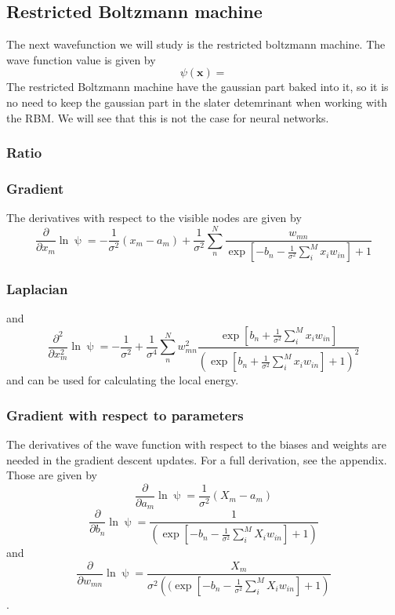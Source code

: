 \subsection{Restricted Boltzmann machine}
The next wavefunction we will study is the restricted boltzmann machine. The wave function value is given by
\begin{equation}
    \psi(\boldsymbol{x}) = 
\end{equation}
The restricted Boltzmann machine have the gaussian part baked into it, so it is no need to keep the gaussian part in the slater detemrinant when working with the RBM. We will see that this is not the case for neural networks. 
\subsubsection{Ratio}

\subsubsection{Gradient}
The derivatives with respect to the visible nodes are given by
\begin{equation}
    \frac{\partial}{\partial x_m}\ln \uppsi = -\frac{1}{\sigma^2}(x_m - a_m) + \frac{1}{\sigma^2} \sum_n^N \frac{w_{mn}}{\exp\left[-b_n - \frac{1}{\sigma^2}\sum_i^Mx_iw_{in}\right] + 1}
\end{equation}
 
\subsubsection{Laplacian}
and 
\begin{equation}
    \frac{\partial^2}{\partial x_m^2}\ln \uppsi = -\frac{1}{\sigma^2} + \frac{1}{\sigma^4}\sum_n^N w^2_{mn}\frac{\exp\left[b_n + \frac{1}{\sigma^2}\sum_i^Mx_iw_{in}\right]}{\left(\exp\left[b_n + \frac{1}{\sigma^2}\sum_i^Mx_iw_{in}\right]+1\right)^2}
\end{equation}
\cite{mhj_ml} and can be used for calculating the local energy.

\subsubsection{Gradient with respect to parameters}
The derivatives of the wave function with respect to the biases and weights are needed in the gradient descent updates. For a full derivation, see the appendix. Those are given by 
\begin{equation}
    \frac{\partial}{\partial a_m}\ln \uppsi = \frac{1}{\sigma^2}(X_m - a_m)
\end{equation}
\begin{equation}
    \frac{\partial}{\partial b_n}\ln \uppsi = \frac{1}{\left(\exp \left[-b_n - \frac{1}{\sigma^2}\sum_i^MX_iw_{in}\right]+1\right)}
\end{equation}
and 
\begin{equation}
    \frac{\partial }{\partial w_{mn}}\ln \uppsi = \frac{X_m}{\sigma^2\left(  (\exp \left[-b_n - \frac{1}{\sigma^2}\sum_i^MX_iw_{in}\right]+1 \right)}
\end{equation}
\cite{mhj_ml}.
